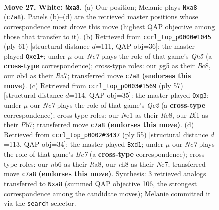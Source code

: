 \documentclass[11pt]{article}
\begin{document}
\clearpage

\begin{figure}[p]\centering
\begin{subfigure}{0.46\textwidth}\centering
\resizebox{\linewidth}{!}{%
\newchessgame
\chessboard[
  setfen={r1b4r/1pN3k1/1n6/2q3pp/1n6/1Q1P1P2/P7/4NB1K w - - 0 27},
  showmover=false,
  pgfstyle=straightmove, color=movearrow, markmove={c7-a8}
]}
\caption{}
\end{subfigure}\hfill
\begin{subfigure}{0.46\textwidth}\centering
\resizebox{\linewidth}{!}{%
\newchessgame
\chessboard[
  setfen={2b2k2/r2n1ppB/p1N4p/8/N6q/8/1PQ3P1/4R1KR b - - 0 31},
  showmover=false,
  pgfstyle=straightmove, color=movearrow, markmove={h4-e1}
]}
\caption{}
\end{subfigure}
\\[4pt]
\begin{subfigure}{0.46\textwidth}\centering
\resizebox{\linewidth}{!}{%
\newchessgame
\chessboard[
  setfen={4r1k1/1pq2p2/6N1/p6p/Pn6/6QP/5PB1/3R2K1 b - - 0 29},
  showmover=false,
  pgfstyle=straightmove, color=movearrow, markmove={c7-g3}
]}
\caption{}
\end{subfigure}\hfill
\begin{subfigure}{0.46\textwidth}\centering
\resizebox{\linewidth}{!}{%
\newchessgame
\chessboard[
  setfen={r7/2n2k2/1p1pqN1p/6p1/2p5/6P1/1BQ1bP1P/3R2K1 b - - 2 28},
  showmover=false,
  pgfstyle=straightmove, color=movearrow, markmove={e2-d1}
]}
\caption{}
\end{subfigure}
\caption{\textbf{Move 27, White: \texttt{Nxa8}.} (a) Our position; Melanie plays \texttt{Nxa8} (\texttt{c7a8}). Panels (b)--(d) are the retrieved master positions whose correspondence most drove this move (highest QAP objective among those that transfer to it). (b) Retrieved from \texttt{ccrl\_top\_p0000\#1045} (ply 61) [structural distance $d$=111, QAP obj=36]: the master played \texttt{Qxe1+}; under $\mu$ our \emph{Nc7} plays the role of that game's \emph{Qh5} (a \textbf{cross-type} correspondence); cross-type roles: our \emph{p}g5 as their \emph{B}c8, our \emph{n}b4 as their \emph{R}a7; transferred move \texttt{c7a8} \textbf{(endorses this move)}. (c) Retrieved from \texttt{ccrl\_top\_p0003\#1569} (ply 57) [structural distance $d$=114, QAP obj=35]: the master played \texttt{Qxg3}; under $\mu$ our \emph{Nc7} plays the role of that game's \emph{Qc2} (a \textbf{cross-type} correspondence); cross-type roles: our \emph{N}e1 as their \emph{R}e8, our \emph{B}f1 as their \emph{P}b7; transferred move \texttt{c7a8} \textbf{(endorses this move)}. (d) Retrieved from \texttt{ccrl\_top\_p0002\#3437} (ply 55) [structural distance $d$=113, QAP obj=34]: the master played \texttt{Bxd1}; under $\mu$ our \emph{Nc7} plays the role of that game's \emph{Be7} (a \textbf{cross-type} correspondence); cross-type roles: our \emph{n}b6 as their \emph{R}a8, our \emph{r}h8 as their \emph{N}c7; transferred move \texttt{c7a8} \textbf{(endorses this move)}. Synthesis: 3 retrieved analogs transferred to \texttt{Nxa8} (summed QAP objective 106, the strongest correspondence among the candidate moves); Melanie committed it via the \texttt{search} selector.}
\label{fig:thought-m52}
\end{figure}
\end{document}
